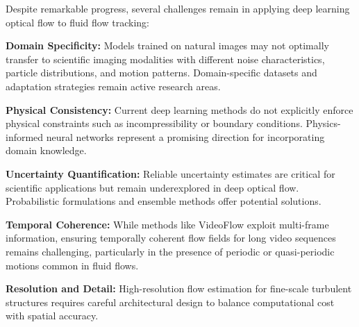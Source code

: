 Despite remarkable progress, several challenges remain in applying deep learning optical flow to fluid flow tracking:

\textbf{Domain Specificity:} Models trained on natural images may not optimally transfer to scientific imaging modalities with different noise characteristics, particle distributions, and motion patterns. Domain-specific datasets and adaptation strategies remain active research areas.

\textbf{Physical Consistency:} Current deep learning methods do not explicitly enforce physical constraints such as incompressibility or boundary conditions. Physics-informed neural networks represent a promising direction for incorporating domain knowledge.

\textbf{Uncertainty Quantification:} Reliable uncertainty estimates are critical for scientific applications but remain underexplored in deep optical flow. Probabilistic formulations and ensemble methods offer potential solutions.

\textbf{Temporal Coherence:} While methods like VideoFlow exploit multi-frame information, ensuring temporally coherent flow fields for long video sequences remains challenging, particularly in the presence of periodic or quasi-periodic motions common in fluid flows.

\textbf{Resolution and Detail:} High-resolution flow estimation for fine-scale turbulent structures requires careful architectural design to balance computational cost with spatial accuracy.

